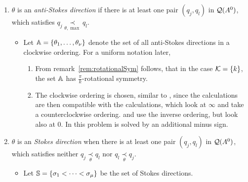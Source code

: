 \begin{defn}\label{defn:antiStokesDir}
  \begin{enumerate}
    \item $\theta$ is an \emph{anti-Stokes direction} if there is at least one
      pair $(q_j,q_l)$ in $\cQ(A^0)$, which satisfies
      $q_j \underset{\theta,\max}{\prec} q_l$.
      \begin{itemize}
        \item Let $\A=\{\theta_1,\dots,\theta_{\nu}\}$ denote the set of all
          anti-Stokes directions in a clockwise ordering. For a uniform
          notation later, 
          \begin{s-rem} \label{rem:rotationalSymPrime}
            \begin{enumerate}
              \item From remark~\ref{rem:rotationalSym} follows, that in the
                case $\cK=\{k\}$, the set $\A$ has $\frac{\pi}{k}$-rotational
                symmetry.
              \item The clockwise ordering is chosen, similar to
                \cite{Loday1994}, since the calculations are then compatible
                with the calculations, which look at $\infty$ and take a
                counterclockwise ordering. \cite{boalch} and \cite{thboalch}
                use the inverse ordering, but look also at $0$.
                In \cite{Loday2014} this problem is solved by an additional
                minus sign.
            \end{enumerate}
          \end{s-rem}
      \end{itemize}
    \item $\theta$ is an \emph{Stokes direction} when there is at least one
      pair $(q_j,q_l)$ in $\cQ(A^0)$, which satisfies neither
      $q_j\underset{\theta}{\prec} q_l$ nor $q_l\underset{\theta}{\prec} q_j$.
      \begin{itemize}
        \item Let $\S=\{\sigma_1<\cdots<\sigma_\mu\}$ be the set of Stokes
          directions.
      \end{itemize}
  \end{enumerate}
\end{defn}

